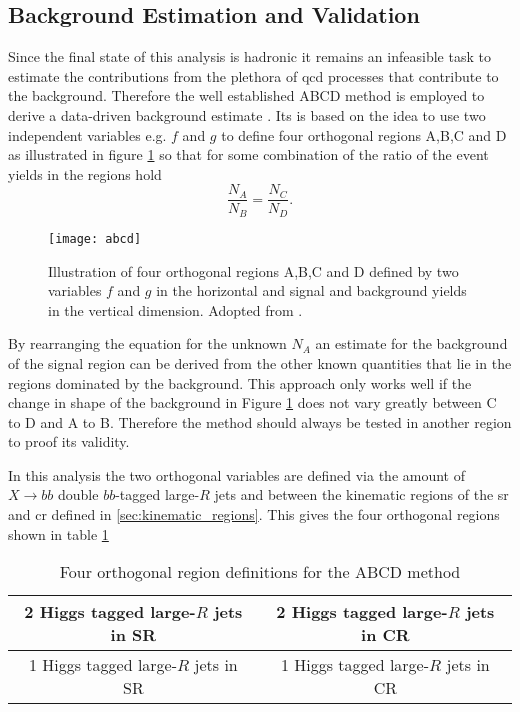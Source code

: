 \subsection{Background Estimation and Validation}
Since the final state of this analysis is hadronic it remains an infeasible task to estimate the contributions from the plethora of \ac{qcd} processes that contribute to the background. Therefore the well established ABCD method is employed to derive a data-driven background estimate \citep{buttinger2018background,PhysRevD.103.035021}. Its is based on the idea to use two independent variables e.g. $f$ and $g$ to define four orthogonal regions A,B,C and D as illustrated in figure \ref{fig:abcd} so that for some combination of the ratio of the event yields in the regions hold
\begin{equation}
    \frac{N_A}{N_B}=\frac{N_C}{N_D}.
\end{equation}
\begin{figure}
    \centering
    \texttt{[image: abcd]}
    \caption[]{Illustration of four orthogonal regions A,B,C and D defined by two variables $f$ and $g$ in the horizontal and signal and background yields in the vertical dimension. Adopted from \citep{PhysRevD.103.035021}.}
    \label{fig:abcd}
\end{figure}
By rearranging the equation for the unknown $N_A$ an estimate for the background of the signal region can be derived from the other known quantities that lie in the regions dominated by the background. This approach only works well if the change in shape of the background in Figure \ref{fig:abcd} does not vary greatly between C to D and A to B. Therefore the method should always be tested in another region to proof its validity.

In this analysis the two orthogonal variables are defined via the amount of $X\rightarrow bb$ double $bb$-tagged large-$R$ jets and between the kinematic regions of the \ac{sr} and \ac{cr} defined in \ref{sec:kinematic_regions}. This gives the four orthogonal regions shown in table \ref{tab:abcd}
\begin{table}[htbp]
    \centering
    \caption{Four orthogonal region definitions for the ABCD method}
    \begin{tabular}{|c|c|}
        \hline
        2 Higgs tagged large-$R$ jets in SR & 2 Higgs tagged large-$R$ jets in CR \\ \hline
        1 Higgs tagged large-$R$ jets in SR & 1 Higgs tagged large-$R$ jets in CR \\ \hline
    \end{tabular}
    \label{tab:abcd}
\end{table}
